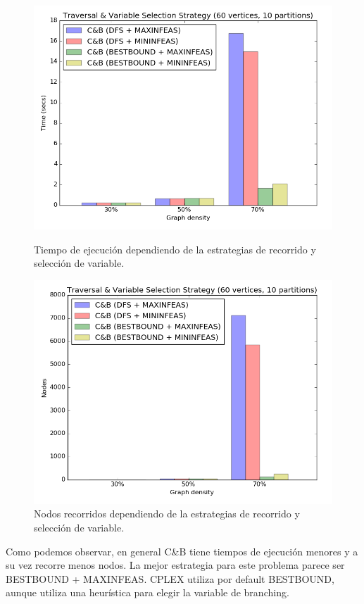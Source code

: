 \begin{figure}[h]
\begin{minipage}[b]{0.49\textwidth}
    \includegraphics[width=\textwidth]{img/9-tree_v60_p10_i1_l30_s2.png}
  \caption{Tiempo de ejecución dependiendo de la estrategias de recorrido y selección de variable.}
  \end{minipage}
  \hfill
  \begin{minipage}[b]{0.49\textwidth}
    \includegraphics[width=\textwidth]{img/9-tree_v60_p10_i1_l30_s2_nodes.png}
  \caption{Nodos recorridos dependiendo de la estrategias de recorrido y selección de variable.}
  \end{minipage}
\end{figure}

Como podemos observar, en general C\&B tiene tiempos de ejecución menores y a su vez recorre menos nodos. La mejor estrategia para este problema parece ser BESTBOUND + MAXINFEAS. CPLEX utiliza por default BESTBOUND, aunque utiliza una heurística para elegir la variable de branching. 